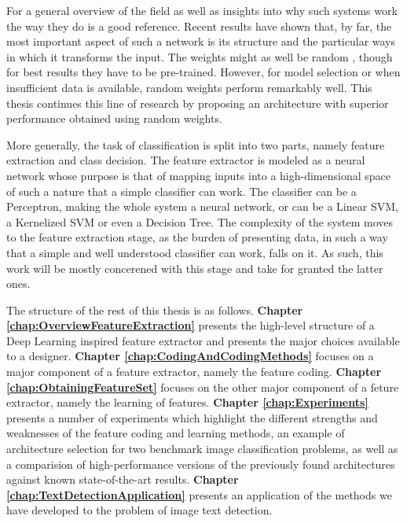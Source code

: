 \documentclass[12pt,a4paper,oneside,english]{UPBThesis}
\begin{document}
For a general overview of the field as well as insights into why such systems work the way they do \cite{learning-deep-architectures-AI} is a good reference. Recent results have shown that, by far, the most important aspect of such a network is its structure and the particular ways in which it transforms the input. The weights might as well be random \cite{random-weights-feature-learning,beyond-simple-features}, though for best results they have to be pre-trained. However, for model selection or when insufficient data is available, random weights perform remarkably well. This thesis continues this line of research by proposing an architecture with superior performance obtained using random weights.

More generally, the task of classification is split into two parts, namely feature extraction and class decision. The feature extractor is modeled as a neural network whose purpose is that of mapping inputs into a high-dimensional space of such a nature that a simple classifier can work. The classifier can be a Perceptron, making the whole system a neural network, or can be a Linear SVM, a Kernelized SVM or even a Decision Tree. The complexity of the system moves to the feature extraction stage, as the burden of presenting data, in such a way that a simple and well understood classifier can work, falls on it. As such, this work will be mostly concerened with this stage and take for granted the latter ones.

The structure of the rest of this thesis is as follows. \textbf{Chapter \ref{chap:OverviewFeatureExtraction}} presents the high-level structure of a Deep Learning inspired feature extractor and presents the major choices available to a designer. \textbf{Chapter \ref{chap:CodingAndCodingMethods}} focuses on a major component of a feature extractor, namely the feature coding. \textbf{Chapter \ref{chap:ObtainingFeatureSet}} focuses on the other major component of a feture extractor, namely the learning of features. \textbf{Chapter \ref{chap:Experiments}} presents a number of experiments which highlight the different strengths and weaknesses of the feature coding and learning methods, an example of architecture selection for two benchmark image classification problems, as well as a comparision of high-performance versions of the previously found architectures against known state-of-the-art results. \textbf{Chapter \ref{chap:TextDetectionApplication}} presents an application of the methods we have developed to the problem of image text detection.
\end{document}
